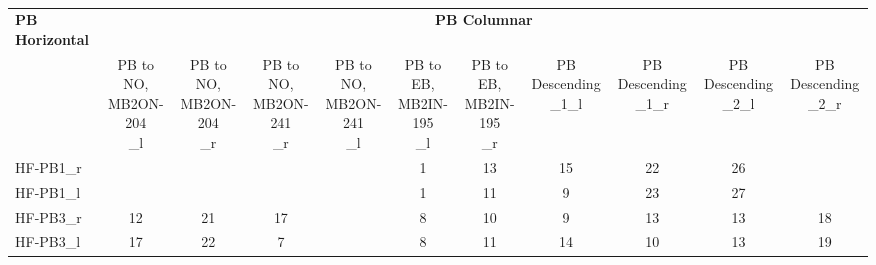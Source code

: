     \begin{table}[h!]
    \centering
    \begin{tabular}{l|cccccccccc}
    \toprule
    \textbf{PB Horizontal} & \multicolumn{10}{c}{\textbf{PB Columnar}} \\
    \cmidrule(lr){2-11}
    & \rot{PB to NO,\\MB2ON-204\\\_l}
    & \rot{PB to NO,\\MB2ON-204\\\_r}
    & \rot{PB to NO,\\MB2ON-241\\\_r}
    & \rot{PB to NO,\\MB2ON-241\\\_l}
    & \rot{PB to EB,\\MB2IN-195\\\_l}
    & \rot{PB to EB,\\MB2IN-195\\\_r}
    & \rot{PB Descending\\\_1\_l}
    & \rot{PB Descending\\\_1\_r}
    & \rot{PB Descending\\\_2\_l}
    & \rot{PB Descending\\\_2\_r} \\
    \midrule
    HF-PB1\_r
    &  &  &  &
    & \cellcolor{forest1}1
    & \cellcolor{forest3}13
    & \cellcolor{forest3}15
    & \cellcolor{forest4}22
    & \cellcolor{forest5}26
    &  \\

    HF-PB1\_l
    &  &  &  &
    & \cellcolor{forest1}1
    & \cellcolor{forest2}11
    & \cellcolor{forest2}9
    & \cellcolor{forest4}23
    & \cellcolor{forest5}27
    &  \\

    HF-PB3\_r
    & \cellcolor{forest3}12
    & \cellcolor{forest4}21
    & \cellcolor{forest3}17
    &
    & \cellcolor{forest2}8
    & \cellcolor{forest2}10
    & \cellcolor{forest2}9
    & \cellcolor{forest3}13
    & \cellcolor{forest3}13
    & \cellcolor{forest4}18 \\

    HF-PB3\_l
    & \cellcolor{forest3}17
    & \cellcolor{forest4}22
    & \cellcolor{forest2}7
    &
    & \cellcolor{forest2}8
    & \cellcolor{forest3}11
    & \cellcolor{forest3}14
    & \cellcolor{forest2}10
    & \cellcolor{forest3}13
    & \cellcolor{forest4}19 \\
    \bottomrule
    \end{tabular}
    \caption[PB horizontal fibers connection to  PB columnar ]{}
    \label{PBconnections}
    \end{table}


